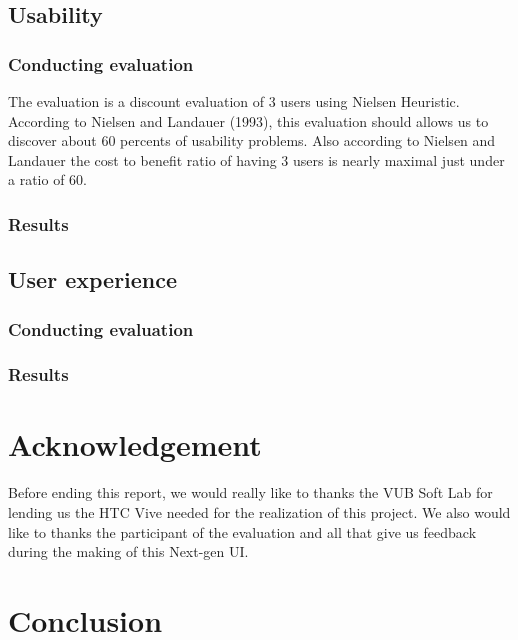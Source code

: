 \documentclass[11pt,a4paper]{article}
\begin{document}


\subsection{Usability}

\subsubsection{Conducting evaluation}

The evaluation is a discount evaluation of 3 users using Nielsen Heuristic. According to Nielsen and Landauer (1993), this evaluation should allows us to discover about 60 percents of usability problems. Also according to Nielsen and Landauer the cost to benefit ratio of having 3 users is nearly maximal just under a ratio of 60.


\subsubsection{Results}

\subsection{User experience}


\subsubsection{Conducting evaluation}

\subsubsection{Results}



\section{Acknowledgement}

Before ending this report, we would really like to thanks the VUB Soft Lab for lending us the HTC Vive needed for the realization of this project.
We also would like to thanks the participant of the evaluation and all that give us feedback during the making of this Next-gen UI.

\section{Conclusion}
\end{document}
